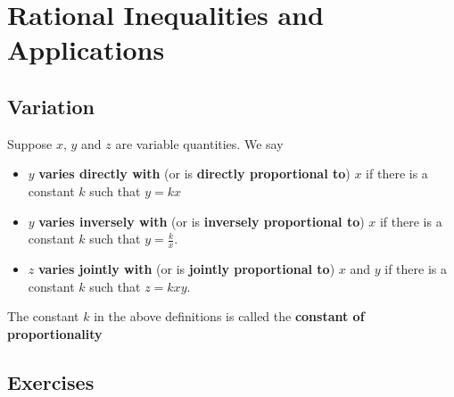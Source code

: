 \section{Rational Inequalities and Applications}

\subsection{Variation}

\begin{definition}[Variations]
    Suppose $x$, $y$ and $z$ are variable quantities. We say
    \begin{itemize}
        \item $y$ \textbf{varies directly with} (or is \textbf{directly proportional to}) $x$ if there is a constant $k$ such that $y=kx$
        \item $y$ \textbf{varies inversely with} (or is \textbf{inversely proportional to}) $x$ if there is a constant $k$ such that $y=\frac{k}{x}$.
        \item $z$ \textbf{varies jointly with} (or is \textbf{jointly proportional to}) $x$ and $y$ if there is a constant $k$ such that $z=kxy$.
    \end{itemize}
    The constant $k$ in the above definitions is called the \textbf{constant of proportionality}
\end{definition}

\subsection{Exercises}
